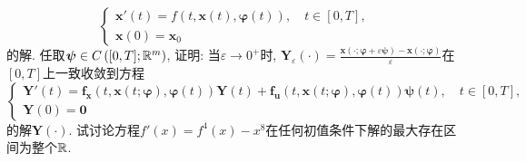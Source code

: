 \begin{quizb}
\[\begin{cases}
\boldsymbol{x}'(t)=f\left(t,\boldsymbol{x}(t),\boldsymbol{\varphi}(t)\right),\quad t\in[0,T],\\
\boldsymbol{x}(0)=\boldsymbol{x}_0
\end{cases}\]的解. 任取\(\boldsymbol{\psi}\in C\left([0,T];\mathbb{R}^m\right)\), 证明: 当\(\varepsilon\rightarrow0^+\)时, \(\boldsymbol{Y}_{\varepsilon}(\cdot)=\frac{\boldsymbol{x}(\cdot;\boldsymbol{\varphi}+\varepsilon\boldsymbol{\psi})-\boldsymbol{x}(\cdot;\boldsymbol{\varphi})}{\varepsilon}\)在\([0,T]\)上一致收敛到方程\[\begin{cases}
\boldsymbol{Y}'(t)=\boldsymbol{f_x}\left(t,\boldsymbol{x}(t;\boldsymbol{\varphi}),\boldsymbol{\varphi}(t)\right)\boldsymbol{Y}(t)+\boldsymbol{f_u}\left(t,\boldsymbol{x}(t;\boldsymbol{\varphi}),\boldsymbol{\varphi}(t)\right)\boldsymbol{\psi}(t),\quad t\in[0,T],\\
\boldsymbol{Y}(0)=\boldsymbol{0}
\end{cases}\]的解\(\boldsymbol{Y}(\cdot)\).
\woe 试讨论方程\(f'(x)=f^4(x)-x^8\)在任何初值条件下解的最大存在区间为整个\(\mathbb{R}\).
\end{quizb}